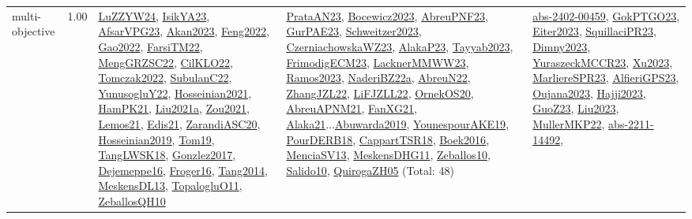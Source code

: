 {\begin{longtable}{p{3cm}r>{\raggedright\arraybackslash}p{6cm}>{\raggedright\arraybackslash}p{6cm}>{\raggedright\arraybackslash}p{8cm}}
\index{multi-objective}\index{Concepts!multi-objective}multi-objective &  1.00 & \hyperref[detail:LuZZYW24]{LuZZYW24}, \hyperref[detail:IsikYA23]{IsikYA23}, \hyperref[detail:AfsarVPG23]{AfsarVPG23}, \hyperref[detail:Akan2023]{Akan2023}, \hyperref[detail:Feng2022]{Feng2022}, \hyperref[detail:Gao2022]{Gao2022}, \hyperref[detail:FarsiTM22]{FarsiTM22}, \hyperref[detail:MengGRZSC22]{MengGRZSC22}, \hyperref[detail:CilKLO22]{CilKLO22}, \hyperref[detail:Tomczak2022]{Tomczak2022}, \hyperref[detail:SubulanC22]{SubulanC22}, \hyperref[detail:YunusogluY22]{YunusogluY22}, \hyperref[detail:Hosseinian2021]{Hosseinian2021}, \hyperref[detail:HamPK21]{HamPK21}, \hyperref[detail:Liu2021a]{Liu2021a}, \hyperref[detail:Zou2021]{Zou2021}, \hyperref[detail:Lemos21]{Lemos21}, \hyperref[detail:Edis21]{Edis21}, \hyperref[detail:ZarandiASC20]{ZarandiASC20}, \hyperref[detail:Hosseinian2019]{Hosseinian2019}, \hyperref[detail:Tom19]{Tom19}, \hyperref[detail:TangLWSK18]{TangLWSK18}, \hyperref[detail:Gonzlez2017]{Gonzlez2017}, \hyperref[detail:Dejemeppe16]{Dejemeppe16}, \hyperref[detail:Froger16]{Froger16}, \hyperref[detail:Tang2014]{Tang2014}, \hyperref[detail:MeskensDL13]{MeskensDL13}, \hyperref[detail:TopalogluO11]{TopalogluO11}, \hyperref[detail:ZeballosQH10]{ZeballosQH10} & \hyperref[detail:PrataAN23]{PrataAN23}, \hyperref[detail:Bocewicz2023]{Bocewicz2023}, \hyperref[detail:AbreuPNF23]{AbreuPNF23}, \hyperref[detail:GurPAE23]{GurPAE23}, \hyperref[detail:Schweitzer2023]{Schweitzer2023}, \hyperref[detail:CzerniachowskaWZ23]{CzerniachowskaWZ23}, \hyperref[detail:AlakaP23]{AlakaP23}, \hyperref[detail:Tayyab2023]{Tayyab2023}, \hyperref[detail:FrimodigECM23]{FrimodigECM23}, \hyperref[detail:LacknerMMWW23]{LacknerMMWW23}, \hyperref[detail:Ramos2023]{Ramos2023}, \hyperref[detail:NaderiBZ22a]{NaderiBZ22a}, \hyperref[detail:AbreuN22]{AbreuN22}, \hyperref[detail:ZhangJZL22]{ZhangJZL22}, \hyperref[detail:LiFJZLL22]{LiFJZLL22}, \hyperref[detail:OrnekOS20]{OrnekOS20}, \hyperref[detail:AbreuAPNM21]{AbreuAPNM21}, \hyperref[detail:FanXG21]{FanXG21}, \hyperref[detail:Alaka21]{Alaka21}...\hyperref[detail:Abuwarda2019]{Abuwarda2019}, \hyperref[detail:YounespourAKE19]{YounespourAKE19}, \hyperref[detail:PourDERB18]{PourDERB18}, \hyperref[detail:CappartTSR18]{CappartTSR18}, \hyperref[detail:Boek2016]{Boek2016}, \hyperref[detail:MenciaSV13]{MenciaSV13}, \hyperref[detail:MeskensDHG11]{MeskensDHG11}, \hyperref[detail:Zeballos10]{Zeballos10}, \hyperref[detail:Salido10]{Salido10}, \hyperref[detail:QuirogaZH05]{QuirogaZH05} (Total: 48) & \hyperref[detail:abs-2402-00459]{abs-2402-00459}, \hyperref[detail:GokPTGO23]{GokPTGO23}, \hyperref[detail:Eiter2023]{Eiter2023}, \hyperref[detail:SquillaciPR23]{SquillaciPR23}, \hyperref[detail:Dimny2023]{Dimny2023}, \hyperref[detail:YuraszeckMCCR23]{YuraszeckMCCR23}, \hyperref[detail:Xu2023]{Xu2023}, \hyperref[detail:MarliereSPR23]{MarliereSPR23}, \hyperref[detail:AlfieriGPS23]{AlfieriGPS23}, \hyperref[detail:Oujana2023]{Oujana2023}, \hyperref[detail:Hajji2023]{Hajji2023}, \hyperref[detail:GuoZ23]{GuoZ23}, \hyperref[detail:Liu2023]{Liu2023}, \hyperref[detail:MullerMKP22]{MullerMKP22}, \hyperref[detail:abs-2211-14492]{abs-2211-14492}, 
\end{longtable}}
